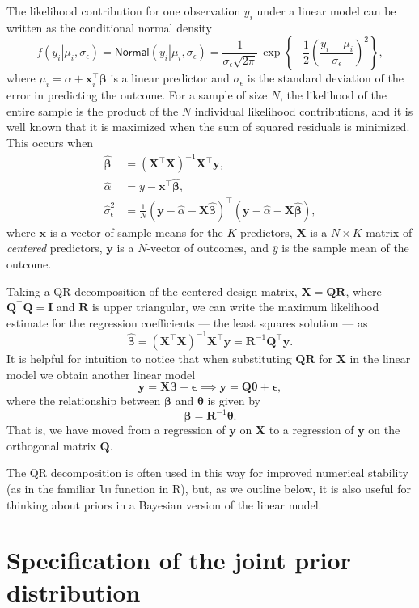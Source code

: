\documentclass[11pt]{article}
\newcommand{\boldbeta}{\boldsymbol{\beta}}
\newcommand{\boldtheta}{\boldsymbol{\theta}}
\newcommand{\boldeps}{\boldsymbol{\epsilon}}
\newcommand{\hatbeta}{\widehat{\boldbeta}}
\newcommand{\hatalpha}{\widehat{\alpha}}
\newcommand{\sigmaEps}{\sigma_{\epsilon}}
\newcommand{\X}{\mathbf{X}}
\newcommand{\y}{\mathbf{y}}
\newcommand{\Q}{\mathbf{Q}}
\newcommand{\R}{\mathbf{R}}
\newcommand{\given}{\left.\right|}
\begin{document}
The likelihood contribution for one observation $y_i$ under a linear model
can be written as the conditional normal density
%
$$
f \left(y_i \given \mu_i, \sigmaEps \right) =
\mathsf{Normal}\left(y_i \given \mu_i, \sigmaEps \right) =
\frac{1}{\sigmaEps \sqrt{2 \pi}} \,
\exp{\left\{-\frac{1}{2} \left(\frac{y_i - \mu_i}{\sigmaEps}\right)^2\right\}},
$$
%
where $\mu_i = \alpha + \mathbf{x}_i^\top \boldbeta$ is a linear predictor and
$\sigmaEps$ is the standard deviation of the error in predicting the outcome.
For a sample of size $N$, the likelihood of the entire sample is the product of
the $N$ individual likelihood contributions, and it is well known that it is
maximized when the sum of squared residuals is minimized. This occurs when
%
\begin{align*}
\hatbeta &= \left(\X^\top \X \right)^{-1} \X^\top \y,\\
\hatalpha &= \overline{y} - \overline{\mathbf{x}}^\top \hatbeta,\\
\widehat{\sigma}_{\epsilon}^2 &=
  \frac{1}{N}
  \left(\y - \hatalpha - \X \hatbeta \right)^\top
  \left(\y - \hatalpha - \X \hatbeta \right),
\end{align*}
%
where $\overline{\mathbf{x}}$ is a vector of sample means for the
$K$ predictors, $\X$ is a $N \times K$ matrix of \emph{centered} predictors,
$\y$ is a $N$-vector of outcomes, and $\overline{y}$ is the sample mean of the
outcome.

Taking a QR decomposition of the centered design matrix, $\X = \Q\R$, where
$\Q^\top \Q = \mathbf{I}$ and $\R$ is upper triangular, we can write the maximum
likelihood estimate for the regression coefficients --- the least squares
solution --- as
%
$$\hatbeta = \left(\X^\top \X \right)^{-1} \X^\top \y = \R^{-1} \Q^\top \y.$$
%
It is helpful for intuition to notice that when substituting $\Q\R$ for $\X$
in the linear model we obtain another linear model
%
$$\y = \X\boldbeta + \boldeps \implies \y = \Q\boldtheta + \boldeps,$$
%
where the relationship between $\boldbeta$ and $\boldtheta$ is given by
%
$$\boldbeta = \R^{-1}\boldtheta.$$
%
That is, we have moved from a regression of $\y$ on $\X$ to a regression of
$\y$ on the orthogonal matrix $\Q$.

The QR decomposition is often used in this way for improved numerical stability
(as in the familiar {\tt lm} function in R), but, as we outline below, it is
also useful for thinking about priors in a Bayesian version of the linear model.


\section{Specification of the joint prior distribution}
\label{sec:priors}
\end{document}
